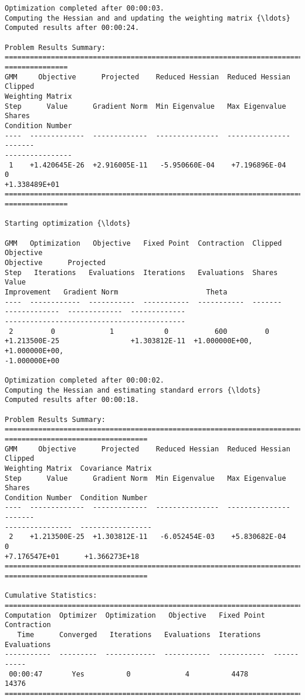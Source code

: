 \begin{Verbatim}[commandchars=\\\{\}]
Optimization completed after 00:00:03.
Computing the Hessian and and updating the weighting matrix {\ldots}
Computed results after 00:00:24.

Problem Results Summary:
================================================================================
===============
GMM     Objective      Projected    Reduced Hessian  Reduced Hessian  Clipped
Weighting Matrix
Step      Value      Gradient Norm  Min Eigenvalue   Max Eigenvalue   Shares
Condition Number
----  -------------  -------------  ---------------  ---------------  -------
----------------
 1    +1.420645E-26  +2.916005E-11   -5.950660E-04    +7.196896E-04      0
+1.338489E+01
================================================================================
===============

Starting optimization {\ldots}

GMM   Optimization   Objective   Fixed Point  Contraction  Clipped    Objective
Objective      Projected
Step   Iterations   Evaluations  Iterations   Evaluations  Shares       Value
Improvement   Gradient Norm                     Theta
----  ------------  -----------  -----------  -----------  -------
-------------  -------------  -------------
-------------------------------------------
 2         0             1            0           600         0
+1.213500E-25                 +1.303812E-11  +1.000000E+00, +1.000000E+00,
-1.000000E+00

Optimization completed after 00:00:02.
Computing the Hessian and estimating standard errors {\ldots}
Computed results after 00:00:18.

Problem Results Summary:
================================================================================
==================================
GMM     Objective      Projected    Reduced Hessian  Reduced Hessian  Clipped
Weighting Matrix  Covariance Matrix
Step      Value      Gradient Norm  Min Eigenvalue   Max Eigenvalue   Shares
Condition Number  Condition Number
----  -------------  -------------  ---------------  ---------------  -------
----------------  -----------------
 2    +1.213500E-25  +1.303812E-11   -6.052454E-03    +5.830682E-04      0
+7.176547E+01      +1.366273E+18
================================================================================
==================================

Cumulative Statistics:
===========================================================================
Computation  Optimizer  Optimization   Objective   Fixed Point  Contraction
   Time      Converged   Iterations   Evaluations  Iterations   Evaluations
-----------  ---------  ------------  -----------  -----------  -----------
 00:00:47       Yes          0             4          4478         14376
===========================================================================


\end{Verbatim}
